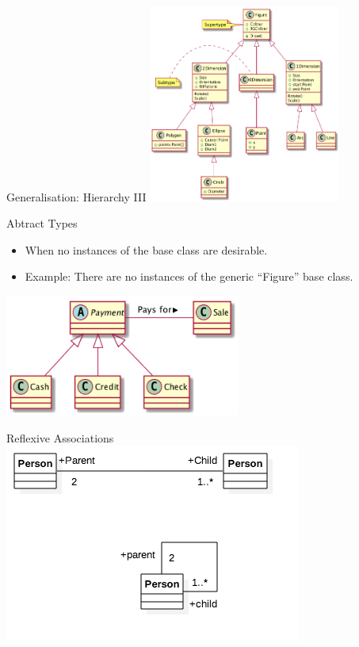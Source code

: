 \documentclass[10pt,t,a4paper]{beamer}
\begin{document}
\begin{frame}[label=sec-1-16]{Generalisation: Hierarchy III}
\includegraphics[height=6.5cm]{FInheritance3.png}
\end{frame}
\begin{frame}[label=sec-1-17]{Abtract Types}
\begin{itemize}
\item When no instances of the base class are desirable.
\item Example: There are no instances of the generic ``Figure'' base class.
\end{itemize}
\includegraphics[height=4cm]{FInheritanceAbstract.png}
\end{frame}
\begin{frame}[label=sec-1-18]{Reflexive Associations}
\includegraphics[width=.9\linewidth]{./FReflexive.png}
\end{frame}
\end{document}
